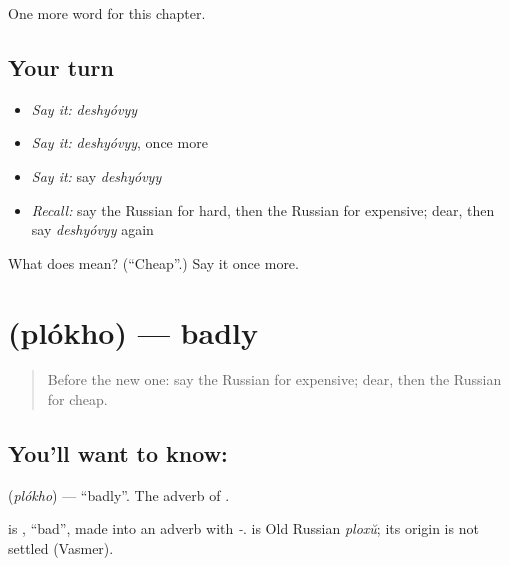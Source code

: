 \begin{grammarlens}[title={What you've built}]
One more word for this chapter.
\end{grammarlens}

\subsection*{Your turn}
\begin{itemize}
\raggedright
  \item \emph{Say it:} \emph{deshyóvyy}
  \item \emph{Say it:} \emph{deshyóvyy}, once more
  \item \emph{Say it:} say \emph{deshyóvyy}
  \item \emph{Recall:} say the Russian for hard, then the Russian for expensive; dear, then say \emph{deshyóvyy} again
\end{itemize}

\begin{tcolorbox}[breakable,colback=teal!4,colframe=teal!35!black,title={Before you move on}]
What does  mean? (\textquotedblleft{}Cheap\textquotedblright{}.) Say it once more.
\end{tcolorbox}
\section[\texorpdfstring{\ru{плохо} (plókho)}{плохо (plókho)}]{ (plókho) — badly}

\label{lesson:RU-C67-badly}



\begin{quote}
Before the new one: say the Russian for expensive; dear, then the Russian for cheap.
\end{quote}

\subsection*{You'll want to know: }
\textbf{} (\emph{plókho}) — \textquotedblleft{}badly\textquotedblright{}. The adverb of \textbf{}.

\begin{cousinweb}
\textbf{} is \emph{}, \textquotedblleft{}bad\textquotedblright{}, made into an adverb with \emph{-}. \emph{} is Old Russian \emph{ploxŭ}; its origin is not settled (Vasmer).
\end{cousinweb}

